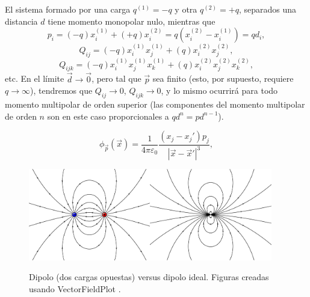 El sistema formado por una carga $q^{(1)}=-q$ y otra $q^{(2)}=+q$, separados una distancia $d$ tiene momento monopolar nulo, mientras que 
\begin{equation}
p_i=(-q)x^{(1)}_i+(+q)x^{(2)}_i=q(x^{(2)}_i-x^{(1)}_i)=qd_i,
\end{equation}
\begin{equation}
Q_{ij}=(-q)x^{(1)}_i x^{(1)}_j +(q)x^{(2)}_i x^{(2)}_j,
\end{equation}
\begin{equation}
Q_{ijk}=(-q)x^{(1)}_i x^{(1)}_jx^{(1)}_k +(q)x^{(2)}_i x^{(2)}_jx^{(2)}_k,
\end{equation}
etc. En el límite $\vec{d}\to\vec{0}$, pero tal que $\vec{p}$ sea finito (esto, por supuesto, requiere $q\to\infty$), tendremos que $Q_{ij}\to 0$, $Q_{ijk}\to 0$, y lo mismo ocurrirá para todo momento multipolar de orden superior  (las componentes del momento multipolar de orden $n$ son en este caso proporcionales a $qd^n=pd^{n-1}$).

\begin{equation}\label{phip}
\phi_{\vec{p}}(\vec{x})=\frac{1}{4\pi\varepsilon_0}\frac{(x_j-x_j')p_j}
{|\vec{x}-\vec{x}'|^3},
\end{equation}
\begin{figure}[H]
\begin{center}
\includegraphics[height=4cm]{fig/fig-E-02.pdf}\hspace{1cm}\includegraphics[height=4cm]{fig/fig-campo-dipolo-electrico.pdf} 
\caption{Dipolo (dos cargas opuestas) versus dipolo ideal. Figuras creadas usando VectorFieldPlot \cite{VFP}.}
\label{fig-dipolos}
\end{center}
\end{figure}
